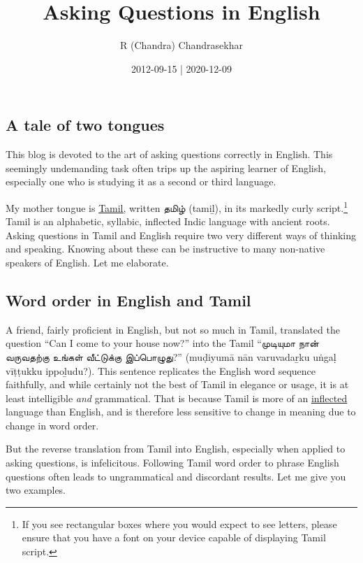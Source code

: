 \documentclass[
  12pt,
  a4paper,
]{article}
\title{Asking Questions in English}
\author{R (Chandra) Chandrasekhar}
\date{2012-09-15 | 2020-12-09}
\begin{document}
\maketitle

\thispagestyle{empty}


\hypertarget{a-tale-of-two-tongues}{%
\subsection{A tale of two tongues}\label{a-tale-of-two-tongues}}

This blog is devoted to the art of asking questions correctly in
English. This seemingly undemanding task often trips up the aspiring
learner of English, especially one who is studying it as a second or
third language.

My mother tongue is
\href{http://en.wikipedia.org/wiki/Tamil_language}{Tamil,} written தமிழ்
(tamiḻ), in its markedly curly script.\footnote{If you see rectangular
  boxes where you would expect to see letters, please ensure that you
  have a font on your device capable of displaying Tamil script.} Tamil
is an alphabetic, syllabic, inflected Indic language with ancient roots.
Asking questions in Tamil and English require two very different ways of
thinking and speaking. Knowing about these can be instructive to many
non-native speakers of English. Let me elaborate.

\hypertarget{word-order-in-english-and-tamil}{%
\subsection{Word order in English and
Tamil}\label{word-order-in-english-and-tamil}}

A friend, fairly proficient in English, but not so much in Tamil,
translated the question ``Can I come to your house now?'' into the Tamil
``முடியுமா நான் வருவதற்கு உங்கள் வீட்டுக்கு இப்பொழுது?'' (muḍiyumā nān
varuvadaṟku uṅgaḷ vīṭṭukku ippoḻudu?). This sentence replicates the
English word sequence faithfully, and while certainly not the best of
Tamil in elegance or usage, it is at least intelligible \emph{and}
grammatical. That is because Tamil is more of an
\href{http://en.wikipedia.org/wiki/Inflection}{inflected} language than
English, and is therefore less sensitive to change in meaning due to
change in word order.

But the reverse translation from Tamil into English, especially when
applied to asking questions, is infelicitous. Following Tamil word order
to phrase English questions often leads to ungrammatical and discordant
results. Let me give you two examples.
\end{document}
